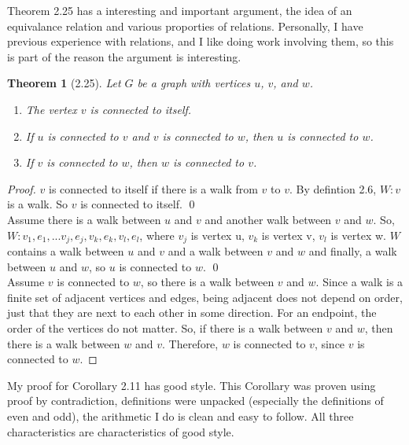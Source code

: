 \documentclass{article}
\newtheorem*{thm}{Theorem}
\begin{document}
\begin{description}
		Theorem 2.25 has a interesting and important argument, the idea of an equivalance relation and various proporties of relations.	
		Personally, I have previous experience with relations, and I like doing work involving them, so this is part of the reason the argument
		is interesting. 

		\begin{thm}[2.25]
		          Let $G$ be a graph with vertices $u$, $v$, and $w$.
        	  \begin{enumerate}
        	    \item The vertex $v$ is connected to itself.
       		    \item If $u$ is connected to $v$ and $v$ is connected to $w$, then $u$ is connected to $w$.
        	    \item If $v$ is connected to $w$, then $w$ is connected to $v$.
         	 \end{enumerate}
 		 \end{thm}
 		  \begin{proof}
        		$v$ is connected to itself if there is a walk from $v$ to $v$. By defintion 2.6, $W: v$ is a walk. So $v$ is connected to itself. \qed
         		 \\
         		Assume there is a walk between $u$ and $v$ and another walk between $v$ and $w$. 
			So, $W: v_1, e_1, ... v_j, e_j, v_k, e_k, v_l, e_l$, where $v_j$     is vertex u, 
			$v_k$ is vertex v, $v_l$ is vertex w. $W$ contains a walk between $u$ and $v$ and a 
			walk between $v$ and $w$ and finally, a walk between $u    $ and $w$,  so $u$ is connected to $w$. \qed
         		 \\
         		Assume $v$ is connected to $w$, so there is a walk between $v$ and $w$. 
			Since a walk is a finite set of adjacent vertices and edges, being adjacent does not depend on order, 
			just that they are next to each other in some direction. For an endpoint, the order of the vertices do not matter.
			So, if there is a walk between $v$ and $w$, then there is a walk between $w$ and $v$. Therefore, $w$ is connected to $v$, 
			since $v$ is connected to $w$.
 		\end{proof}
	
		My proof for Corollary 2.11 has good style. This Corollary was proven using proof by contradiction, definitions were unpacked
		(especially the definitions of even and odd), the arithmetic I do is clean and easy to follow. All three characteristics are 
		characteristics of good style.
	

\end{description}
\end{document}
